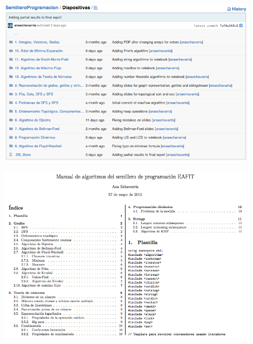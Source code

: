 \documentclass{beamer}
\begin{document}
	\begin{frame}
		\includegraphics[width = \textwidth]{./img/git2.png}
	\end{frame}
	
	\begin{frame}
		\includegraphics[width = \textwidth]{./img/manual1.png}
	\end{frame}
	
\end{document}
